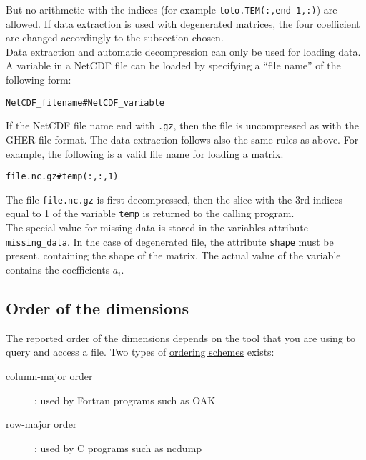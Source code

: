 \documentclass[a4paper,12pt]{article}
\newcommand{\code}{\texttt}
\begin{document}
But no arithmetic with the indices (for example
\code{toto.TEM(:,end-1,:)}) are allowed. If data extraction is used
with degenerated matrices, the four coefficient are changed
accordingly to the subsection chosen.\\

Data extraction and automatic decompression can only be used
for loading data.  \\

A variable in a NetCDF file can be loaded by specifying a ``file name'' of
the following form:

\begin{verbatim}
NetCDF_filename#NetCDF_variable
\end{verbatim}

If the NetCDF file name end with \code{.gz}, then the file is uncompressed
as with the GHER file format. The data extraction follows also the same
rules as above. For example, the following is a valid file name for
loading a matrix. \\

\begin{verbatim}
file.nc.gz#temp(:,:,1)
\end{verbatim}

The file \code{file.nc.gz} is first decompressed, then the slice with
the 3rd indices equal to 1 of the variable \code{temp} is returned to
the calling program. \\
 
The special value for missing data is stored in the variables attribute
\code{missing\_data}. In the case of degenerated file, the attribute
\code{shape} must be present, containing the shape of the matrix. The actual value
of the variable contains the coefficients $a_i$.

\subsection{Order of the dimensions}

The reported order of the dimensions depends on the tool that you are using to query and access a file. Two types of \href{http://en.wikipedia.org/wiki/Row-major\_order}{ordering schemes} exists:

\begin{description}
\item[column-major order]: used by Fortran programs such as OAK
\item[row-major order]: used by C programs such as ncdump
\end{description}
\end{document}
